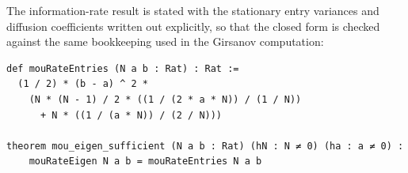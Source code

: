 The information-rate result is stated with the stationary entry variances and diffusion coefficients written out explicitly, so that the closed form is checked against the same bookkeeping used in the Girsanov computation:

\begin{lstlisting}
def mouRateEntries (N a b : Rat) : Rat :=
  (1 / 2) * (b - a) ^ 2 *
    (N * (N - 1) / 2 * ((1 / (2 * a * N)) / (1 / N))
      + N * ((1 / (a * N)) / (2 / N)))

theorem mou_eigen_sufficient (N a b : Rat) (hN : N ≠ 0) (ha : a ≠ 0) :
    mouRateEigen N a b = mouRateEntries N a b
\end{lstlisting}
